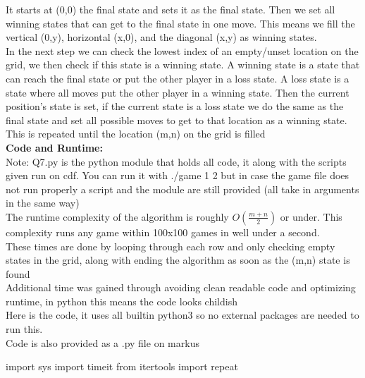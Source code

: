 \documentclass[a4paper,12pt]{article}
\begin{document}
\begin{enumerate}
		It starts at (0,0) the final state and sets it as the final state. Then we set all winning states that can get to the final state in one move. This means we fill the vertical (0,y), horizontal (x,0), and the diagonal (x,y) as winning states.\\
		
		In the next step we can check the lowest index of an empty/unset location on the grid, we then check if this state is a winning state. A winning state is a state that can reach the final state or put the other player in a loss state. A loss state is a state where all moves put the other player in a winning state. Then the current position's state is set, if the current state is a loss state we do the same as the final state and set all possible moves to get to that location as a winning state.\\
		
		This is repeated until the location (m,n) on the grid is filled\\
		
		\textbf{Code and Runtime:}\\
		
		Note: Q7.py is the python module that holds all code, it along with the scripts given run on cdf. You can run it with ./game 1 2 but in case the game file does not run properly a script and the module are still provided (all take in arguments in the same way)\\
		
		The runtime complexity of the algorithm is roughly $O(\frac{m+n}{2})$ or under. This complexity runs any game within 100x100 games in well under a second. \\
		
		These times are done by looping through each row and only checking empty states in the grid, along with ending the algorithm as soon as the (m,n) state is found \\
		
		Additional time was gained through avoiding clean readable code and optimizing runtime, in python this means the code looks childish\\
		
		
		Here is the code, it uses all builtin python3 so no external packages are needed to run this.\\
		Code is also provided as a .py file on markus\\
		
		\begin{python}
		import sys
		import timeit
		from itertools import repeat
		

\end{python}
\end{enumerate}
\end{document}
